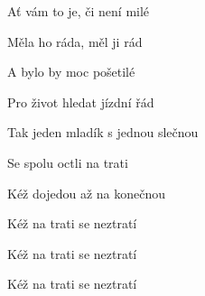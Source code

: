 \begin{song}
\bigskip

 Ať vám to je, či není milé  \par
{} Měla ho ráda, měl ji rád  \par
{} A bylo by moc pošetilé  \par
{} Pro život hledat jízdní řád \par
{} Tak jeden mladík s jednou slečnou \par
{} Se spolu octli na trati  \par
{} Kéž dojedou až na konečnou  \par
{} Kéž na trati se neztratí \par
{} Kéž na trati se neztratí \par
{} Kéž na trati se neztratí \par

\end{song}
